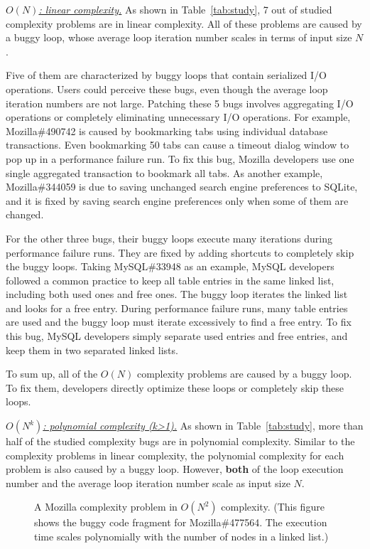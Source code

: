 {\underline{\textit{$O(N)$: linear complexity.}}} 
As shown in Table~\ref{tab:study}, 
7 out of \ComBugs studied complexity problems are in linear complexity. 
All of these problems are caused by a buggy loop, 
whose average loop iteration number scales in terms of input size $N$.

Five of them are characterized by buggy loops that contain serialized I/O operations.
Users could perceive these bugs, 
even though the average loop iteration numbers are not large.
Patching these 5 bugs involves aggregating I/O operations 
or completely eliminating unnecessary I/O operations. 
For example, Mozilla\#490742 is caused by bookmarking 
tabs using individual database transactions. 
Even bookmarking 50 tabs can cause a timeout dialog 
window to pop up in a performance failure run. 
To fix this bug, Mozilla developers use one single aggregated transaction 
to bookmark all tabs.
As another example, Mozilla\#344059 is due to saving unchanged 
search engine preferences to SQLite, 
and it is fixed by saving search 
engine preferences only when some of them are changed.

For the other three bugs,
their buggy loops execute many iterations during performance failure runs.
They are fixed by adding shortcuts to completely skip the buggy loops. 
Taking MySQL\#33948 as an example,
MySQL developers followed a common practice to keep all table entries in the same linked list, 
including both used ones and free ones. 
The buggy loop iterates the linked list and looks for a free entry.
During performance failure runs, 
many table entries are used and the buggy loop must iterate excessively to find a free entry.
To fix this bug, MySQL developers simply separate used entries and free entries,
and keep them in two separated linked lists. 

To sum up, all of the $O(N)$ complexity problems are caused by a buggy loop. 
To fix them, developers directly optimize these loops or completely skip these loops. 


{\underline{\textit{$O(N^k)$: polynomial complexity (k>1).}}}
As shown in Table~\ref{tab:study}, 
more than half of the studied complexity bugs are in polynomial complexity. 
Similar to the complexity problems in linear complexity,
the polynomial complexity for each problem is also caused by a buggy loop.
However, {\bf both} of the loop execution number 
and the average loop iteration number
scale as input size $N$.


\begin{figure}
\centering
{}
  \mbox{}
  \vspace{-0.1in}
\caption{A Mozilla complexity problem in $O(N^2)$ complexity.
\footnotesize{(This figure shows the buggy code fragment for Mozilla\#477564. 
The execution time scales polynomially with the number of nodes in a linked list.)}}
\vspace{-0.05in}
\label{fig:Mozilla477564}
\vspace{-0.15in}
\end{figure}

